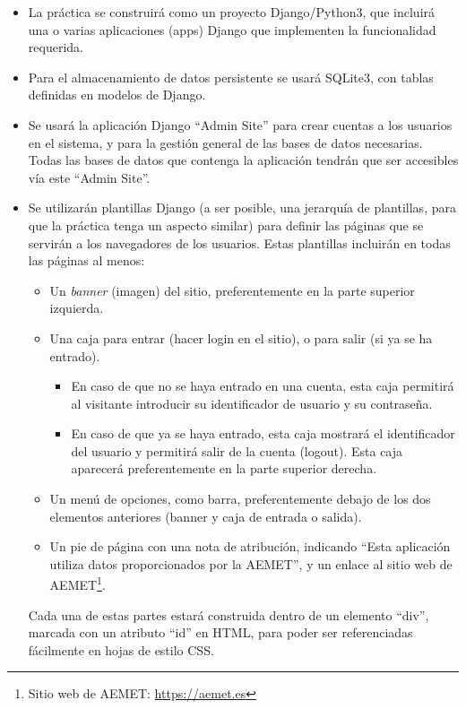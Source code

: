 \begin{itemize}

  \item La práctica se construirá como un proyecto Django/Python3, que incluirá una o varias aplicaciones (apps) Django que implementen la funcionalidad requerida.

  \item Para el almacenamiento de datos persistente se usará SQLite3, con tablas definidas en modelos de Django.

  \item Se usará la aplicación Django ``Admin Site'' para crear cuentas a los usuarios en el sistema, y para la gestión general de las bases de datos necesarias. Todas las bases de datos que contenga la aplicación tendrán que ser accesibles vía este ``Admin Site''.

  \item Se utilizarán plantillas Django (a ser posible, una jerarquía de plantillas, para que la práctica tenga un aspecto similar) para definir las páginas que se servirán a los navegadores de los usuarios. Estas plantillas incluirán en todas las páginas al menos:
  \begin{itemize}
  \item Un \emph{banner} (imagen) del sitio, preferentemente en la parte superior izquierda.
  \item Una caja para entrar (hacer login en el sitio), o para salir (si ya se ha entrado).
  \begin{itemize}
    \item En caso de que no se haya entrado en una cuenta, esta caja permitirá al visitante introducir su identificador de usuario y su contraseña. 
    \item En caso de que ya se haya entrado, esta caja mostrará el identificador del usuario y permitirá salir de la cuenta (logout). Esta caja aparecerá preferentemente en la parte superior derecha.
  \end{itemize}
  \item Un menú de opciones, como barra, preferentemente debajo de los dos elementos anteriores (banner y caja de entrada o salida).
  \item Un pie de página con una nota de atribución, indicando ``Esta aplicación utiliza datos proporcionados por la AEMET'', y un enlace al sitio web de AEMET\footnote{Sitio web de AEMET: \url{https://aemet.es}}.
  \end{itemize}

Cada una de estas partes estará construida dentro de un elemento ``div'', marcada con un atributo ``id'' en HTML, para poder ser referenciadas fácilmente en hojas de estilo CSS.


\end{itemize}
